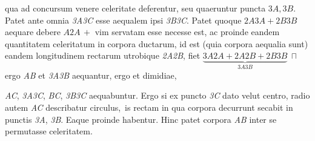 %
qua ad concursum\protect{} venere celeritate
deferentur, seu quaeruntur puncta ${\scriptstyle \textit{3}}A, {\scriptstyle \textit{3}}B$.
\pend
%
\pstart
Patet ante omnia \textit{{\scriptsize3}A{\scriptsize3}C} esse aequalem
ipsi \textit{{\scriptsize3}B{\scriptsize3}C}. 
\pend
%
\pstart
Patet quoque ${\scriptstyle \textit{2}}A{\scriptstyle \textit{3}}A + {\scriptstyle \textit{2}}B{\scriptstyle \textit{3}}B$ aequare debere $A{\scriptstyle \textit{2}}A \,+$ 
%
%
 vim%
\protect{} servatam esse necesse est, ac proinde eandem quantitatem celeritatum
in corpora ductarum,%
\protect{} id est (quia corpora aequalia sunt) eandem longitudinem rectarum 
%
%
utrobique \textit{{\scriptsize2}A{\scriptsize2}B}, fiet
%
$\underbrace{{\scriptstyle \textit{3}}A{\scriptstyle \textit{2}}A+{\scriptstyle \textit{2}}A{\scriptstyle \textit{2}}B+{\scriptstyle \textit{2}}B{\scriptstyle \textit{3}}B}_{\displaystyle{\scriptstyle \textit{3}}A{\scriptstyle \textit{3}}B} \ \sqcap$%
%
%
ergo \textit{AB} et \textit{{\scriptsize3}A{\scriptsize3}B} aequantur, ergo et dimidiae,
%
\rule[0cm]{0mm}{10pt}%
\textit{AC}, \textit{{\scriptsize3}A{\scriptsize3}C}, \textit{BC}, \textit{{\scriptsize3}B{\scriptsize3}C} aequabuntur. Ergo si ex puncto \textit{{\scriptsize3}C}
dato velut centro, radio autem \textit{AC} describatur circulus\lbrack,\rbrack\ is rectam in qua corpora decurrunt
secabit in punctis \textit{{\scriptsize3}A}, \textit{{\scriptsize3}B}. Eaque proinde habentur. Hinc patet corpora \textit{AB} inter se
permutasse celeritatem.
\pend \pstart
\noindent

